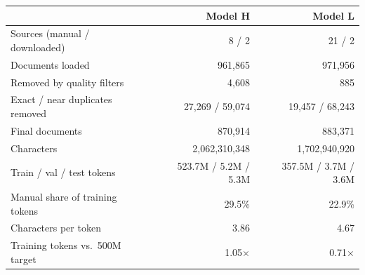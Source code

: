 \begin{tabular}{lrr}
\toprule
 & Model H & Model L \\
\midrule
Sources (manual / downloaded) & 8 / 2 & 21 / 2 \\
Documents loaded & 961,865 & 971,956 \\
Removed by quality filters & 4,608 & 885 \\
Exact / near duplicates removed & 27,269 / 59,074 & 19,457 / 68,243 \\
Final documents & 870,914 & 883,371 \\
Characters & 2,062,310,348 & 1,702,940,920 \\
Train / val / test tokens & 523.7M / 5.2M / 5.3M & 357.5M / 3.7M / 3.6M \\
Manual share of training tokens & 29.5\% & 22.9\% \\
Characters per token & 3.86 & 4.67 \\
Training tokens vs.\ 500M target & 1.05$\times$ & 0.71$\times$ \\
\bottomrule
\end{tabular}
